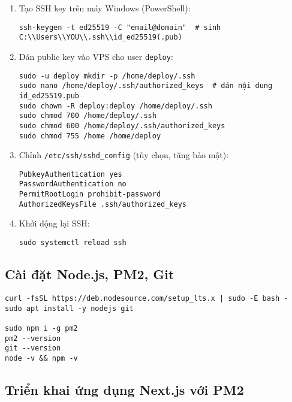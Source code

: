 \documentclass[12pt,a4paper]{article}
\begin{document}
\begin{enumerate}
  \item Tạo SSH key trên máy Windows (PowerShell):
\begin{lstlisting}
ssh-keygen -t ed25519 -C "email@domain"  # sinh C:\\Users\\YOU\\.ssh\\id_ed25519(.pub)
\end{lstlisting}
  \item Dán public key vào VPS cho user \texttt{deploy}:
\begin{lstlisting}
sudo -u deploy mkdir -p /home/deploy/.ssh
sudo nano /home/deploy/.ssh/authorized_keys  # dán nội dung id_ed25519.pub
sudo chown -R deploy:deploy /home/deploy/.ssh
sudo chmod 700 /home/deploy/.ssh
sudo chmod 600 /home/deploy/.ssh/authorized_keys
sudo chmod 755 /home /home/deploy
\end{lstlisting}
  \item Chỉnh \texttt{/etc/ssh/sshd\_config} (tùy chọn, tăng bảo mật):
\begin{lstlisting}
PubkeyAuthentication yes
PasswordAuthentication no
PermitRootLogin prohibit-password
AuthorizedKeysFile .ssh/authorized_keys
\end{lstlisting}
  \item Khởi động lại SSH:
\begin{lstlisting}
sudo systemctl reload ssh
\end{lstlisting}
\end{enumerate}

\subsection{Cài đặt Node.js, PM2, Git}

\begin{lstlisting}[caption=Cài Node.js LTS, PM2, Git]
curl -fsSL https://deb.nodesource.com/setup_lts.x | sudo -E bash -
sudo apt install -y nodejs git

sudo npm i -g pm2
pm2 --version
git --version
node -v && npm -v
\end{lstlisting}

\subsection{Triển khai ứng dụng Next.js với PM2}
\end{document}
